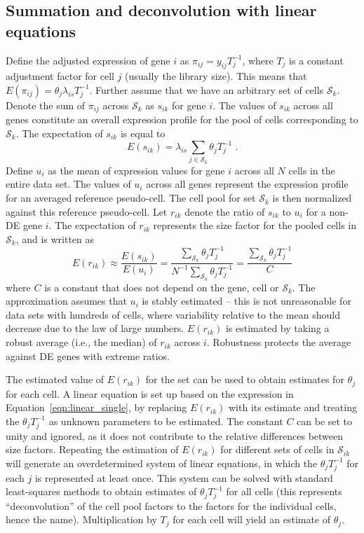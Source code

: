 \documentclass{article}
\begin{document}
\subsection{Summation and deconvolution with linear equations}
Define the adjusted expression of gene $i$ as $\pi_{ij} = y_{ij}T_j^{-1}$, where $T_j$ is a constant adjustment factor for cell $j$ (usually the library size).
This means that $E(\pi_{ij}) =\theta_j\lambda_{is} T_j^{-1}$.
Further assume that we have an arbitrary set of cells $\mathcal{S}_k$.
Denote the sum of $\pi_{ij}$ across $\mathcal{S}_k$ as $s_{ik}$ for gene $i$.
The values of $s_{ik}$ across all genes constitute an overall expression profile for the pool of cells corresponding to $\mathcal{S}_k$.
The expectation of $s_{ik}$ is equal to 
\[
    E(s_{ik}) = \lambda_{is} \sum_{j \in \mathcal{S}_k} \theta_j T_j^{-1}\;.
\]
Define $u_{i}$ as the mean of expression values for gene $i$ across all $N$ cells in the entire data set.
The values of $u_{i}$ across all genes represent the expression profile for an averaged reference pseudo-cell.
The cell pool for set $\mathcal{S}_k$ is then normalized against this reference pseudo-cell.
Let $r_{ik}$ denote the ratio of $s_{ik}$ to $u_{i}$ for a non-DE gene $i$.
The expectation of $r_{ik}$ represents the size factor for the pooled cells in $\mathcal{S}_k$, and is written as
\begin{equation}
    E(r_{ik}) \approx \frac{E(s_{ik})}{E(u_{i})} 
    = \frac{\sum_{\mathcal{S}_k} \theta_j T_j^{-1}}{ N^{-1} \sum_{\mathcal{S}_0} \theta_j T_j^{-1}} 
    = \frac{\sum_{\mathcal{S}_k} \theta_j T_j^{-1}}{C}
    \label{eqn:linear_single}
\end{equation}
where $C$ is a constant that does not depend on the gene, cell or $\mathcal{S}_k$.
The approximation assumes that $u_{i}$ is stably estimated 
    -- this is not unreasonable for data sets with hundreds of cells, where variability relative to the mean should decrease due to the law of large numbers.
$E(r_{ik})$ is estimated by taking a robust average (i.e., the median) of $r_{ik}$ across $i$.
Robustness protects the average against DE genes with extreme ratios.

The estimated value of $E(r_{ik})$ for the set can be used to obtain estimates for $\theta_j$ for each cell.
A linear equation is set up based on the expression in Equation~\ref{eqn:linear_single}, 
by replacing $E(r_{ik})$ with its estimate and treating the $\theta_j T_j^{-1}$ as unknown parameters to be estimated.
The constant $C$ can be set to unity and ignored, as it does not contribute to the relative differences between size factors.
Repeating the estimation of $E(r_{ik})$ for different sets of cells in $\mathcal{S}_{ik}$ will generate an overdetermined system of linear equations, 
    in which the $\theta_j T_j^{-1}$ for each $j$ is represented at least once.
This system can be solved with standard least-squares methods to obtain estimates of $\theta_j T_j^{-1}$ for all cells 
    (this represents ``deconvolution'' of the cell pool factors to the factors for the individual cells, hence the name).
Multiplication by $T_j$ for each cell will yield an estimate of $\theta_j$.
\end{document}
